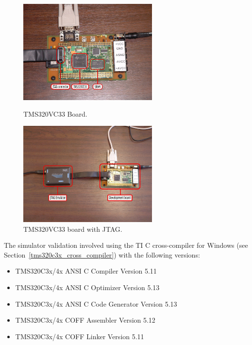 \begin{figure}[!h]
	\begin{center}
		\begin{minipage}{\textwidth}
			\begin{minipage}{8.0cm}
				\begin{center}
					\includegraphics[width=7.0cm]{tms320c3x/fig_tms320c3x_board.jpg}
					\caption{\label{fig:tms320c3x_board} TMS320VC33 Board.}
				\end{center}
			\end{minipage}
			\begin{minipage}{8.0cm}
				\begin{center}
					\includegraphics[width=7.0cm]{tms320c3x/fig_tms320c3x_dev_kit.jpg}
					\caption{\label{fig:tms320c3x_jtag_emu} TMS320VC33 board with JTAG.}
				\end{center}
			\end{minipage}
		\end{minipage}
	\end{center}
\end{figure}

The simulator validation involved using the TI C cross-compiler for Windows (see Section~\ref{tms320c3x_cross_compiler}) with the following versions:
\begin{itemize}
\item TMS320C3x/4x ANSI C Compiler Version 5.11
\item TMS320C3x/4x ANSI C Optimizer Version 5.13
\item TMS320C3x/4x ANSI C Code Generator Version 5.13
\item TMS320C3x/4x COFF Assembler Version 5.12
\item TMS320C3x/4x COFF Linker Version 5.11
\end{itemize}

